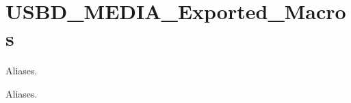 \hypertarget{group__USBD__MEDIA__Exported__Macros}{}\section{U\+S\+B\+D\+\_\+\+M\+E\+D\+I\+A\+\_\+\+Exported\+\_\+\+Macros}
\label{group__USBD__MEDIA__Exported__Macros}


Aliases.  


Aliases. 

